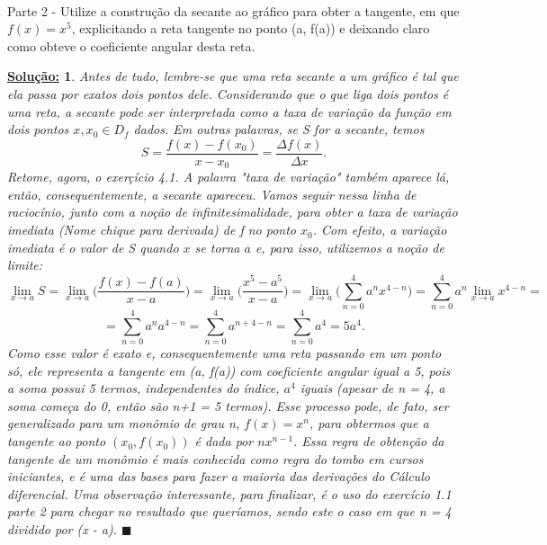 \documentclass{article}
\newtheorem*{sol*}{\underline{Solu\c c\~ao:}}
\renewcommand\qedsymbol{$\blacksquare$}
\begin{document}
\paragraph{} Parte 2 - Utilize a constru\c c\~ao da secante ao gr\'afico para obter a tangente, em que $f(x) = x^5$, explicitando a reta tangente no ponto (a, f(a)) e deixando claro como obteve o coeficiente angular desta reta.
\begin{sol*}
Antes de tudo, lembre-se que uma reta secante a um gr\'afico \'e tal que ela passa por exatos dois pontos dele. Considerando que o que liga dois pontos \'e uma reta, a secante pode ser interpretada como a taxa de varia\c c\~ao da fun\c c\~ao em dois pontos $x, x_0\in{D_f}$ dados. Em outras palavras, se S for a secante, temos
$$
S = \frac{f(x) - f(x_0)}{x - x_0} = \frac{\Delta{f(x)}}{\Delta{x}}.
$$
Retome, agora, o exer\c c\'icio 4.1. A palavra "taxa de varia\c c\~ao" tamb\'em aparece l\'a, ent\~ao, consequentemente, a secante apareceu. Vamos seguir nessa linha de racioc\'inio, junto com a no\c c\~ao de infinitesimalidade, para obter a taxa de varia\c c\~ao imediata (Nome chique para derivada) de f no ponto $x_0$. Com efeito, a varia\c c\~ao imediata \'e o valor de S quando $x$ se torna $a$ e, para isso, utilizemos a no\c c\~ao de limite:
$$
\lim_{x\to{a}} S = \lim_{x\to{a}}\biggl(\frac{f(x) - f(a)}{x - a}\biggr) = \lim_{x\to{a}}\biggl(\frac{x^5 - a^5}{x - a}\biggr) = \lim_{x\to{a}}\biggl(\sum_{n=0}^{4}a^nx^{4-n}\biggr) = \sum_{n=0}^{4}a^n\lim_{x\to{a}}x^{4-n}= 
$$
$$
= \sum_{n=0}^{4}a^na^{4-n} = \sum_{n=0}^{4}a^{n+4-n} = \sum_{n=0}^{4}a^4 = 5a^4 .
$$
Como esse valor \'e exato e, consequentemente uma reta passando em um ponto s\'o, ele representa a tangente em (a, f(a)) com coeficiente angular igual a 5, pois a soma possui 5 termos, independentes do \'indice, $a^4$ iguais (apesar de n = 4, a soma come\c ca do 0, ent\~ao s\~ao n+1 = 5 termos). Esse processo pode, de fato, ser generalizado para um mon\^omio de grau n, $f(x) = x^n$, para obtermos que a tangente ao ponto $(x_0, f(x_0))$ \'e dada por $nx^{n-1}.$ Essa regra de obten\c c\~ao da tangente de um mon\^omio \'e mais conhecida como regra do tombo em cursos iniciantes, e \'e uma das bases para fazer a maioria das deriva\c c\~oes do C\'alculo diferencial. Uma observa\c c\~ao interessante, para finalizar, \'e o uso do exerc\'icio 1.1 parte 2 para chegar no resultado que quer\'iamos, sendo este o caso em que n = 4 dividido por (x - a).
\qedsymbol
\end{sol*}
\end{document}
